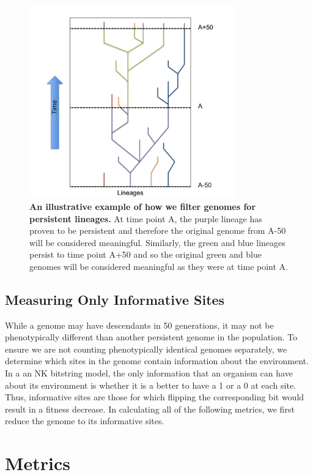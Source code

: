 \documentclass[letterpaper]{article}
\begin{document}
\begin{figure}
\includegraphics[width=3.5in]{figs/LineageFigure.png}
\caption{\textbf{An illustrative example of how we filter genomes for persistent lineages.} At time point A, the purple lineage has proven to be persistent and therefore the original genome from A-50 will be considered meaningful. Similarly, the green and blue lineages persist to time point A+50 and so the original green and blue genomes will be considered meaningful as they were at time point A.}
\label{lineages}
\end{figure}

\subsection{Measuring Only Informative Sites}
    While a genome may have descendants in 50 generations, it may not be phenotypically different than another persistent genome in the population. To ensure we are not counting phenotypically identical genomes separately, we determine which sites in the genome contain information about the environment. In a an NK bitstring model, the only information that an organism can have about its environment is whether it is a better to have a 1 or a 0 at each site. Thus, informative sites are those for which flipping the corresponding bit would result in a fitness decrease. In calculating all of the following metrics, we first reduce the genome to its informative sites.

\section{Metrics}
\end{document}
